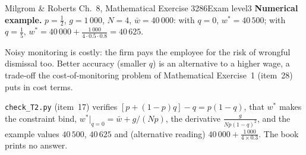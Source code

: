 \begin{exsol}{Milgrom \& Roberts Ch.~8, Mathematical Exercise 3}{286}{Exam level}{3}
\textbf{Numerical example.} $p = \frac12$, $g = 1\,000$, $N = 4$, $\bar w = 40\,000$: with $q = 0$, $w^* =
40\,500$; with $q = \frac15$, $w^* = 40\,000 + \frac{1\,000}{4 \cdot 0.5 \cdot 0.8} = 40\,625$.

\interp Noisy monitoring is costly: the firm pays the employee for the risk of wrongful dismissal too. Better
accuracy (smaller $q$) is an alternative to a higher wage, a trade-off the cost-of-monitoring problem of
Mathematical Exercise~1 (item~28) puts in cost terms.

\verify \texttt{check\_T2.py} (item~17) verifies $[p + (1-p)q] - q = p(1-q)$, that $w^*$ makes the constraint bind,
$w^*|_{q=0} = \bar w + g/(Np)$, the derivative $\frac{g}{Np(1-q)^2}$, and the example values $40\,500$, $40\,625$
and (alternative reading) $40\,000 + \frac{1\,000}{4 \times 0.3}$. The book prints no answer.

\end{exsol}
